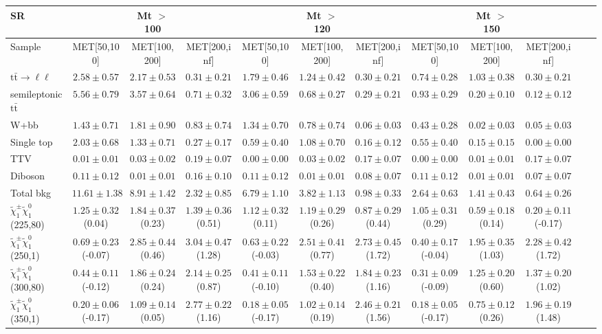 \begin{table}
\begin{center}
\small
\begin{tabular}{lccccccccccc}
\hline
SR & & Mt $>$ 100 & & & Mt $>$ 120 & & &Mt $>$ 150 & & &\\
\hline
Sample&MET[50,100]&MET[100,200]&MET[200,inf]&MET[50,100]&MET[100,200]&MET[200,inf]&MET[50,100]&MET[100,200]&MET[200,inf]&\\
\hline
$\mathrm{t}\bar{\mathrm{t}}\rightarrow \ell\ell$&$2.58\pm0.57$&$2.17\pm0.53$&$0.31\pm0.21$&$1.79\pm0.46$&$1.24\pm0.42$&$0.30\pm0.21$&$0.74\pm0.28$&$1.03\pm0.38$&$0.30\pm0.21$\\
semileptonic $\mathrm{t}\bar{\mathrm{t}}$&$5.56\pm0.79$&$3.57\pm0.64$&$0.71\pm0.32$&$3.06\pm0.59$&$0.68\pm0.27$&$0.29\pm0.21$&$0.93\pm0.29$&$0.20\pm0.10$&$0.12\pm0.12$\\
W+bb&$1.43\pm0.71$&$1.81\pm0.90$&$0.83\pm0.74$&$1.34\pm0.70$&$0.78\pm0.74$&$0.06\pm0.03$&$0.43\pm0.28$&$0.02\pm0.03$&$0.05\pm0.03$\\
Single top&$2.03\pm0.68$&$1.33\pm0.71$&$0.27\pm0.17$&$0.59\pm0.40$&$1.08\pm0.70$&$0.16\pm0.12$&$0.55\pm0.40$&$0.15\pm0.15$&$0.00\pm0.00$\\
TTV&$0.01\pm0.01$&$0.03\pm0.02$&$0.19\pm0.07$&$0.00\pm0.00$&$0.03\pm0.02$&$0.17\pm0.07$&$0.00\pm0.00$&$0.01\pm0.01$&$0.17\pm0.07$\\
Diboson&$0.11\pm0.12$&$0.01\pm0.01$&$0.16\pm0.10$&$0.11\pm0.12$&$0.01\pm0.01$&$0.08\pm0.07$&$0.11\pm0.12$&$0.01\pm0.01$&$0.07\pm0.07$\\
\hline
Total bkg&$11.61\pm1.38$&$8.91\pm1.42$&$2.32\pm0.85$&$6.79\pm1.10$&$3.82\pm1.13$&$0.98\pm0.33$&$2.64\pm0.63$&$1.41\pm0.43$&$0.64\pm0.26$\\
$\tilde{\chi}_{1}^{\pm}\tilde{\chi}_{1}^{0}$ (225,80)&$1.25\pm0.32$(0.04)&$1.84\pm0.37$(0.23)&$1.39\pm0.36$(0.51)&$1.12\pm0.32$(0.11)&$1.19\pm0.29$(0.26)&$0.87\pm0.29$(0.44)&$1.05\pm0.31$(0.29)&$0.59\pm0.18$(0.14)&$0.20\pm0.11$(-0.17)\\
$\tilde{\chi}_{1}^{\pm}\tilde{\chi}_{1}^{0}$ (250,1)&$0.69\pm0.23$(-0.07)&$2.85\pm0.44$(0.46)&$3.04\pm0.47$(1.28)&$0.63\pm0.22$(-0.03)&$2.51\pm0.41$(0.77)&$2.73\pm0.45$(1.72)&$0.40\pm0.17$(-0.04)&$1.95\pm0.35$(1.03)&$2.28\pm0.42$(1.72)\\
$\tilde{\chi}_{1}^{\pm}\tilde{\chi}_{1}^{0}$ (300,80)&$0.44\pm0.11$(-0.12)&$1.86\pm0.24$(0.24)&$2.14\pm0.25$(0.87)&$0.41\pm0.11$(-0.10)&$1.53\pm0.22$(0.40)&$1.84\pm0.23$(1.16)&$0.31\pm0.09$(-0.09)&$1.25\pm0.20$(0.60)&$1.37\pm0.20$(1.02)\\
$\tilde{\chi}_{1}^{\pm}\tilde{\chi}_{1}^{0}$ (350,1)&$0.20\pm0.06$(-0.17)&$1.09\pm0.14$(0.05)&$2.77\pm0.22$(1.16)&$0.18\pm0.05$(-0.17)&$1.02\pm0.14$(0.19)&$2.46\pm0.21$(1.56)&$0.18\pm0.05$(-0.17)&$0.75\pm0.12$(0.26)&$1.96\pm0.19$(1.48)\\
\hline
\hline\hline
\end{tabular}
\end{center}
\end{table}
